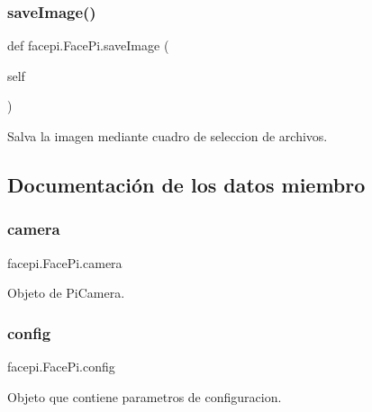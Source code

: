 \subsubsection{\texorpdfstring{save\+Image()}{saveImage()}}
{\footnotesize\ttfamily def facepi.\+Face\+Pi.\+save\+Image (\begin{DoxyParamCaption}\item[{}]{self }\end{DoxyParamCaption})}



Salva la imagen mediante cuadro de seleccion de archivos. 



\subsection{Documentación de los datos miembro}
\mbox{\label{classfacepi_1_1_face_pi_af8d79e94815c80b1ea8b98df8b5565f1}} 
\subsubsection{\texorpdfstring{camera}{camera}}
{\footnotesize\ttfamily facepi.\+Face\+Pi.\+camera}



Objeto de Pi\+Camera. 

\mbox{\label{classfacepi_1_1_face_pi_a0d82f2516e0c5daae93625f34a05eab6}} 
\subsubsection{\texorpdfstring{config}{config}}
{\footnotesize\ttfamily facepi.\+Face\+Pi.\+config}



Objeto que contiene parametros de configuracion. 

\mbox{\label{classfacepi_1_1_face_pi_aec6ab9276df6b39fdcf1ac346c28877e}} 
